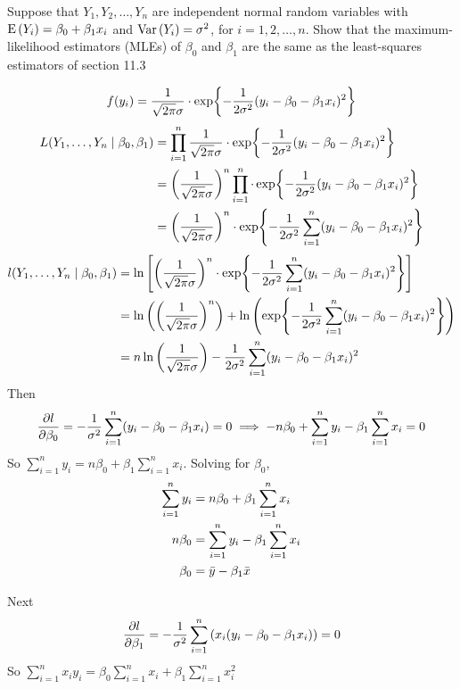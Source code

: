 Suppose that $Y_1, Y_2, \ldots, Y_n$ are independent normal random variables with $\E{Y_i} = \beta_0 + \beta_1 x_i$ and $\Var{Y_i} = \sigma^2$, for $i = 1, 2, \ldots, n$. Show that the maximum-likelihood estimators (MLEs) of $\beta_0$ and $\beta_1$ are the same as the least-squares estimators of section 11.3

\soln*
$$f(y_i) = \over{\sqrt{2\pi} \sigma} \cdot \exp{-\over{2\sigma^2} (y_i - \beta_0 - \beta_1 x_i)^2}$$
\begin{align*}
    L(Y_1, \ldots, Y_n \mid \beta_0, \beta_1) &= \prod_{i=1}^n \over{\sqrt{2\pi} \sigma} \cdot \exp{-\over{2\sigma^2} (y_i - \beta_0 - \beta_1 x_i)^2}
    \\ &= \pover{\sqrt{2\pi} \sigma}^n \prod_{i=1}^n  \cdot \exp{-\over{2\sigma^2} (y_i - \beta_0 - \beta_1 x_i)^2}
    \\ &= \pover{\sqrt{2\pi} \sigma}^n \cdot \exp{-\over{2\sigma^2} \sum_{i=1}^n  (y_i - \beta_0 - \beta_1 x_i)^2}\\
\end{align*}
\begin{align*}
l(Y_1, \ldots, Y_n \mid \beta_0, \beta_1) &= \ln \brac{\pover{\sqrt{2\pi} \sigma}^n \cdot \exp{-\over{2\sigma^2} \sum_{i=1}^n  (y_i - \beta_0 - \beta_1 x_i)^2}} \\
    &= \ln \pars{\pover{\sqrt{2\pi} \sigma}^n} + \ln \pars{\exp{-\over{2\sigma^2} \sum_{i=1}^n  (y_i - \beta_0 - \beta_1 x_i)^2}} \\
    &= n \ln \pover{\sqrt{2\pi} \sigma}  -\over{2\sigma^2} \sum_{i=1}^n  (y_i - \beta_0 - \beta_1 x_i)^2
\end{align*}
Then $$\pdv{l}{\beta_0} = -\over{\sigma^2} \sum_{i=1}^n  (y_i - \beta_0 - \beta_1 x_i) = 0 \implies -n\beta_0 + \sum_{i=1}^n y_i - \beta_1 \sum_{i=1}^n x_i = 0$$
So $\sum_{i=1}^n y_i = n\beta_0 + \beta_1 \sum_{i=1}^n x_i$. Solving for $\beta_0$,
\begin{align*}
    \sum_{i=1}^n y_i &= n\beta_0 + \beta_1 \sum_{i=1}^n x_i \\
    n\beta_0 &= \sum_{i=1}^n y_i - \beta_1 \sum_{i=1}^n x_i\\
    \beta_0 &= \bar{y} - \beta_1 \bar{x}
\end{align*}

\nnl Next $$\pdv{l}{\beta_1} = -\over{\sigma^2} \sum_{i=1}^n  \pars{x_i(y_i - \beta_0 - \beta_1 x_i)} = 0$$
So $\sum_{i=1}^n x_i y_i = \beta_0 \sum_{i=1}^n x_i + \beta_1 \sum_{i=1}^n x_i^2$

